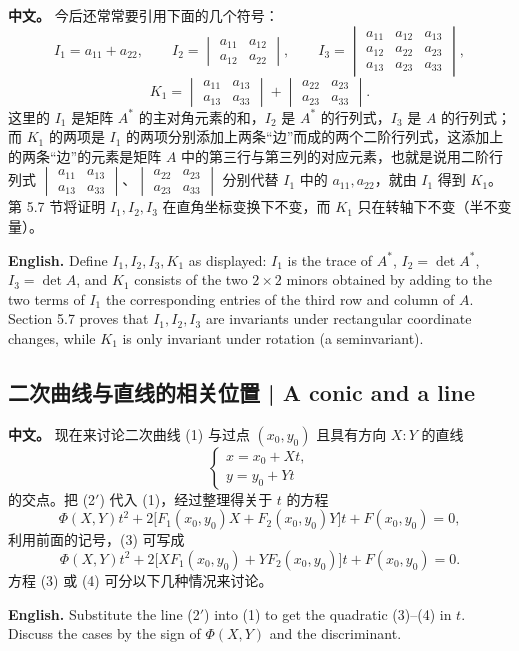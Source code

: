 \documentclass[UTF8,11pt,a4paper]{ctexart}
\newcommand{\APS}[2]{\par\noindent\textbf{中文。} #1\par\noindent\textbf{English.} #2\par\smallskip}
\theoremstyle{definition}
\begin{document}
\APS{今后还常常要引用下面的几个符号：
\[
I_1=a_{11}+a_{22},\qquad
I_2={\begin{vmatrix}a_{11}&a_{12}\\ a_{12}&a_{22}\end{vmatrix}},\qquad
I_3={\begin{vmatrix}a_{11}&a_{12}&a_{13}\\ a_{12}&a_{22}&a_{23}\\ a_{13}&a_{23}&a_{33}\end{vmatrix}},
\]
\[
K_1={\begin{vmatrix}a_{11}&a_{13}\\ a_{13}&a_{33}\end{vmatrix}}+{\begin{vmatrix}a_{22}&a_{23}\\ a_{23}&a_{33}\end{vmatrix}}.
\]
这里的 $I_1$ 是矩阵 $A^*$ 的主对角元素的和，$I_2$ 是 $A^*$ 的行列式，$I_3$ 是 $A$ 的行列式；而 $K_1$ 的两项是 $I_1$ 的两项分别添加上两条``边''而成的两个二阶行列式，这添加上的两条``边''的元素是矩阵 $A$ 中的第三行与第三列的对应元素，也就是说用二阶行列式 $\begin{vmatrix}a_{11}&a_{13}\\ a_{13}&a_{33}\end{vmatrix}$、$\begin{vmatrix}a_{22}&a_{23}\\ a_{23}&a_{33}\end{vmatrix}$ 分别代替 $I_1$ 中的 $a_{11},a_{22}$，就由 $I_1$ 得到 $K_1$。第 5.7 节将证明 $I_1,I_2,I_3$ 在直角坐标变换下不变，而 $K_1$ 只在转轴下不变（半不变量）。}{Define $I_1,I_2,I_3,K_1$ as displayed: $I_1$ is the trace of $A^*$, $I_2=\det A^*$, $I_3=\det A$, and $K_1$ consists of the two $2\times2$ minors obtained by adding to the two terms of $I_1$ the corresponding entries of the third row and column of $A$. Section 5.7 proves that $I_1,I_2,I_3$ are invariants under rectangular coordinate changes, while $K_1$ is only invariant under rotation (a seminvariant).}

\subsection{二次曲线与直线的相关位置 | A conic and a line}
\APS{现在来讨论二次曲线 (1) 与过点 $(x_0,y_0)$ 且具有方向 $X:Y$ 的直线
\[
\begin{cases}x=x_0+Xt,\\ y=y_0+Yt\end{cases}\tag{2$'$}
\]
的交点。把 (2$'$) 代入 (1)，经过整理得关于 $t$ 的方程
\[
\Phi(X,Y)t^2+2\bigl[F_1(x_0,y_0)X+F_2(x_0,y_0)Y\bigr]t+F(x_0,y_0)=0,\tag{3}
\]
利用前面的记号，(3) 可写成
\[
\Phi(X,Y)t^2+2\bigl[XF_1(x_0,y_0)+YF_2(x_0,y_0)\bigr]t+F(x_0,y_0)=0.\tag{4}
\]
方程 (3) 或 (4) 可分以下几种情况来讨论。}{Substitute the line (2$'$) into (1) to get the quadratic (3)--(4) in $t$. Discuss the cases by the sign of $\Phi(X,Y)$ and the discriminant.}
\end{document}
